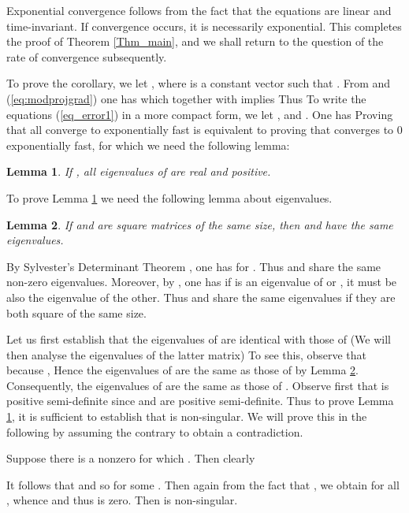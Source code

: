 \documentclass{aims}
\newtheorem{lem}{\textbf{Lemma}}
\def\eq#1{}
\def\n{{\bf n}}
\begin{document}
Exponential convergence follows from the fact that the equations are linear and time-invariant. If convergence occurs, it is necessarily exponential. This completes the proof of Theorem \ref{Thm_main}, and we shall return to the question of the rate of convergence subsequently.

\bigskip


To prove the corollary, we let , where  is a constant vector such that . From  and (\ref{eq:modprojgrad}) one has
  which together with  implies  Thus \eq{\label{eq_error1}\dot e_i=-P_i\sum_{j\in \mathcal N_i}(e_i-e_j)-(I-P_i)e_i, \quad i\in \n}
To write the equations (\ref{eq_error1}) in a more compact form, we let ,  and . One has \eq{\label{eq_error2}\dot e=-(P\bar{L}+I-P)e} Proving that all  converge to  exponentially fast is equivalent to proving that  converges to 0 exponentially fast, for which we need the following lemma:
\begin{lem}\label{Lem_eig} If , all eigenvalues of  are real and positive.
\end{lem}

To prove Lemma \ref{Lem_eig} we need the following lemma about eigenvalues.
\begin{lem}\label{Lem_eigP}
If  and  are square matrices of the same size, then  and  have the same eigenvalues.
\end{lem}
 By Sylvester's Determinant Theorem \cite{Syl51}, one has \eq{\det(I-\frac{1}{\lambda}MN)=\det( I-\frac{1}{\lambda}NM)} for . Thus  and  share the same non-zero eigenvalues. Moreover, by , one has if  is an eigenvalue of  or , it must be also the eigenvalue of the other. Thus  and  share the same eigenvalues if they are both square of the same size. 

 Let us first establish that the eigenvalues of  are identical with those of  (We will then analyse the eigenvalues of the latter matrix) To see this, observe that because , 
Hence the eigenvalues of  are the same as those of  by Lemma \ref{Lem_eigP}. Consequently, the eigenvalues of  are the same as those of . Observe first that  is positive semi-definite since  and  are positive semi-definite. Thus to prove Lemma \ref{Lem_eig}, it is sufficient to establish that  is non-singular. We will prove this in the following by assuming the contrary to obtain a contradiction.


Suppose there is a nonzero  for which . Then clearly

It follows that  and so  for some . Then again from the fact that , we obtain  for all , whence  and thus  is zero. Then  is non-singular. 
\bigskip
\end{document}
